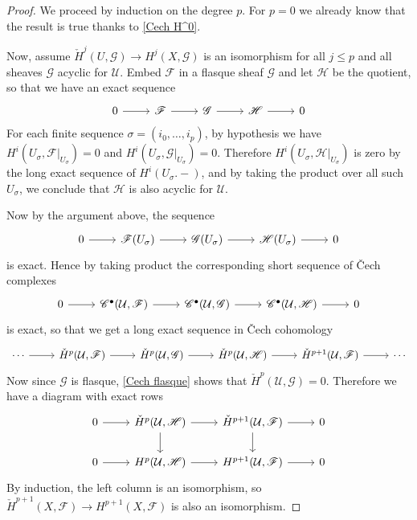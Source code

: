 \begin{proof}
We proceed by induction on the degree $p$. For $p=0$ we already know that the result is true thanks to \cref{Cech H^0}.\par
Now, assume $\check{H}^j(U,\mathscr{G})\to H^j(X,\mathscr{G})$ is an isomorphism for all $j\leq p$ and all sheaves $\mathscr{G}$ acyclic for $\mathcal{U}$. Embed $\mathscr{F}$ in a flasque sheaf $\mathscr{G}$ and let $\mathscr{H}$ be the quotient, so that we have an exact sequence
\[\begin{tikzcd}
0\ar[r]&\mathscr{F}\ar[r]&\mathscr{G}\ar[r]&\mathscr{H}\ar[r]&0
\end{tikzcd}\]
For each finite sequence $\sigma=(i_0,\dots,i_p)$, by hypothesis  we have $H^i(U_\sigma,\mathscr{F}|_{U_\sigma})=0$ and $H^i(U_\sigma,\mathscr{G}|_{U_\sigma})=0$. Therefore $H^i(U_\sigma,\mathscr{H}|_{U_\sigma})$ is zero by the long exact sequence of $H^i(U_\sigma.-)$, and by taking the product over all such $U_\sigma$, we conclude that $\mathscr{H}$ is also acyclic for $\mathcal{U}$.\par
Now by the argument above, the sequence
\[\begin{tikzcd}
0\ar[r]&\mathscr{F}(U_\sigma)\ar[r]&\mathscr{G}(U_\sigma)\ar[r]&\mathscr{H}(U_\sigma)\ar[r]&0
\end{tikzcd}\]
is exact. Hence by taking product the corresponding short sequence of \v{C}ech complexes
\[\begin{tikzcd}
0\ar[r]&\mathscr{C}^\bullet(\mathcal{U},\mathscr{F})\ar[r]&\mathscr{C}^\bullet(\mathcal{U},\mathscr{G})\ar[r]&\mathscr{C}^\bullet(\mathcal{U},\mathscr{H})\ar[r]&0
\end{tikzcd}\]
is exact, so that we get a long exact sequence in \v{C}ech cohomology
\[\begin{tikzcd}
\cdots\ar[r]&\check{H}^{p}(\mathcal{U},\mathscr{F})\ar[r]&\check{H}^{p}(\mathcal{U},\mathscr{G})\ar[r]&\check{H}^{p}(\mathcal{U},\mathscr{H})\ar[r]&\check{H}^{p+1}(\mathcal{U},\mathscr{F})\ar[r]&\cdots
\end{tikzcd}\]
Now since $\mathscr{G}$ is flasque, \cref{Cech flasque} shows that $\check{H}^p(\mathcal{U},\mathscr{G})=0$. Therefore we have a diagram with exact rows
\[\begin{tikzcd}
0\ar[r]&\check{H}^{p}(\mathcal{U},\mathscr{H})\ar[r]\ar[d]&\check{H}^{p+1}(\mathcal{U},\mathscr{F})\ar[r]\ar[d]&0\\
0\ar[r]&H^{p}(\mathcal{U},\mathscr{H})\ar[r]&H^{p+1}(\mathcal{U},\mathscr{F})\ar[r]&0
\end{tikzcd}\]
By induction, the left column is an isomorphism, so $\check{H}^{p+1}(X,\mathscr{F})\to H^{p+1}(X,\mathscr{F})$ is also an isomorphism.
\end{proof}
